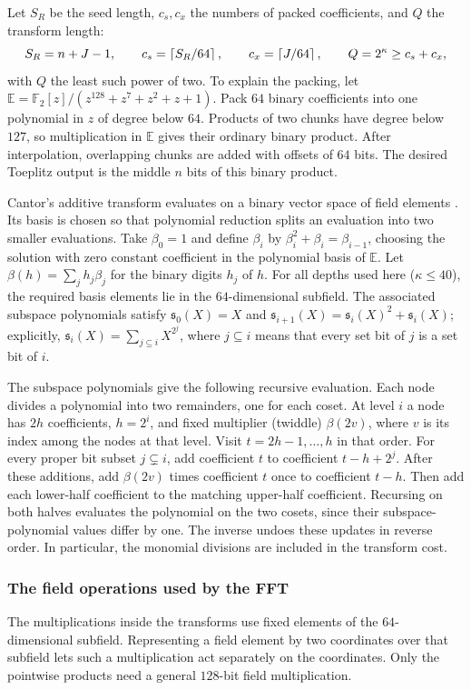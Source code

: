 \documentclass[b5paper, 10pt, abstract=true, captions=tableheading]{scrartcl}
\theoremstyle{plain}
\theoremstyle{definition}
\newcommand{\FF}{\mathds{F}}
\begin{document}
Let $S_R$ be the seed length, $c_s,c_x$ the numbers of packed coefficients,
and $Q$ the transform length:
\[
 S_R=n+J-1,\qquad c_s=\left\lceil S_R/64\right\rceil,\qquad c_x=\left\lceil J/64\right\rceil,
 \qquad Q=2^\kappa\ge c_s+c_x,
\]
with $Q$ the least such power of two. To explain the packing, let
$\mathbb E=\FF_2[z]/(z^{128}+z^7+z^2+z+1)$. Pack $64$ binary coefficients
into one polynomial in $z$ of degree below $64$. Products of two chunks
have degree below $127$, so multiplication in $\mathbb E$ gives their
ordinary binary product. After interpolation, overlapping chunks are
added with offsets of $64$ bits. The desired Toeplitz output is the middle
$n$ bits of this binary product.

Cantor's additive transform evaluates on a binary vector space of field
elements \cite{Cantor1989}. Its basis is chosen so that polynomial
reduction splits an evaluation into two smaller evaluations. Take $\beta_0=1$ and define $\beta_i$ by
$\beta_i^2+\beta_i=\beta_{i-1}$, choosing the solution with zero constant
coefficient in the polynomial basis of $\mathbb E$. Let
$\beta(h)=\sum_j h_j\beta_j$ for the binary digits $h_j$ of $h$.
For all depths used here ($\kappa\leq40$), the required basis elements
lie in the $64$-dimensional subfield.
The associated subspace polynomials satisfy $\mathfrak s_0(X)=X$ and
$\mathfrak s_{i+1}(X)=\mathfrak s_i(X)^2+\mathfrak s_i(X)$; explicitly,
$\mathfrak s_i(X)=\sum_{j\subseteq i}X^{2^j}$, where $j\subseteq i$ means that
every set bit of $j$ is a set bit of $i$.

The subspace polynomials give the following recursive evaluation.
Each node divides a polynomial into two remainders, one for each coset. At level $i$ a node
has $2h$ coefficients, $h=2^i$, and fixed multiplier (twiddle) $\beta(2v)$, where $v$ is its
index among the nodes at that level. Visit $t=2h-1,\ldots,h$ in that
order. For every proper bit subset $j\subsetneq i$, add coefficient $t$
to coefficient $t-h+2^j$. After these additions, add $\beta(2v)$ times
coefficient $t$ once to coefficient $t-h$. Then add each lower-half coefficient to the matching
upper-half coefficient. Recursing on both halves evaluates the polynomial
on the two cosets, since their subspace-polynomial values differ by one.
The inverse undoes these updates in reverse order. In particular, the
monomial divisions are included in the transform cost.

\subsubsection{The field operations used by the FFT}
The multiplications inside the transforms use fixed elements of the
$64$-dimensional subfield. Representing a field
element by two coordinates over that subfield lets such a multiplication
act separately on the coordinates. Only the pointwise products need a
general $128$-bit field multiplication.
\end{document}

